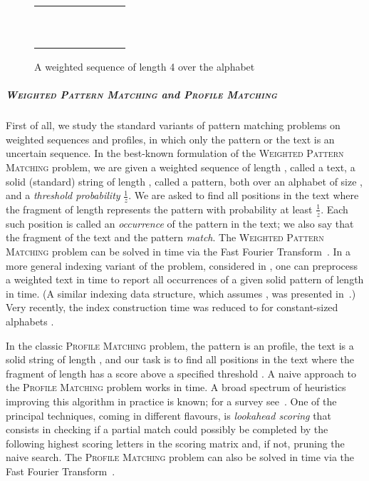 \documentclass{article}
\theoremstyle{plain}
\theoremstyle{definition}
\newcommand{\PM}{\textsc{Profile Matching}\xspace}
\newcommand{\WPM}{\textsc{Weighted Pattern Matching}\xspace}
\newcommand{\fr}{\ensuremath{\frac1z}}
\begin{document}
      \begin{figure}[htpb]
      \renewcommand*{\arraystretch}{1.2}
      \begin{center}
      \begin{tabular}{|c|c|c|c|}
        \hline
         &  &  &  \\
        \hline
        \  \ & \  \ & \  \ & \  \ \\
        \  \ & \  \ & \  \ & \  \ \\
        \hline
      \end{tabular}
      \end{center}
      \caption{A weighted sequence  of length 4 over the alphabet }\label{table:weighted_sequence}
      \end{figure}

  \subparagraph*{\WPM and \PM}
  First of all, we study the standard variants of pattern matching problems on weighted sequences and profiles,
  in which only the pattern or the text is an uncertain sequence.
  In the best-known formulation of the \WPM problem, we are given a weighted sequence of length , called a text,
  a solid (standard) string of length , called a pattern, both over an alphabet of size ,
  and a \emph{threshold probability} \fr.
  We are asked to find all positions in the text where the fragment
  of length  represents the pattern with probability at least \fr.
  Each such position is called an \emph{occurrence} of the pattern in the text;
  we also say that the fragment of the text and the pattern \emph{match}.
  The \WPM problem can be solved in  time via the Fast Fourier Transform~\cite{KCL_publication}.
  In a more general indexing variant of the problem, considered in
  \cite{amir_weighted_property_matching_j,costas_weighted_suffix_tree_j}, one can preprocess a weighted text
  in  time to report all  occurrences of a given solid pattern of length  in  time.
  (A similar indexing data structure, which assumes , was presented in~\cite{DBLP:conf/edbt/BiswasPTS16}.)
  Very recently, the index construction time was reduced to  for constant-sized alphabets \cite{CPM2016}.

  In the classic \PM problem, the pattern is an  profile, the text is a solid string of length , and
  our task is to find all positions in the text where the fragment of length  has a score above a specified
  threshold .
  A naive approach to the \PM problem works in  time.
  A broad spectrum of heuristics improving this algorithm in practice is known; for a survey see~\cite{DBLP:journals/tcs/PizziU08}.
  One of the principal techniques, coming in different flavours, is \emph{lookahead scoring} that consists in checking if a partial match
  could possibly be completed by the following highest scoring letters in the scoring matrix and, if not, pruning the
  naive search.
  The \PM problem can also be solved in  time via the Fast Fourier Transform~\cite{DBLP:journals/jcb/RajasekaranJS02}.
  
\end{document}
